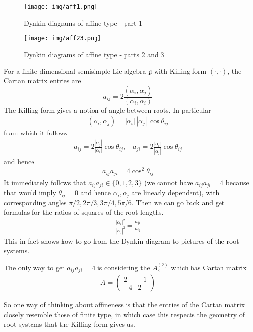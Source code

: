 \documentclass[12pt]{article}
\begin{document}
\begin{figure}[H]
    \centering
    \texttt{[image: img/aff1.png]}
    \caption{Dynkin diagrams of affine type - part 1}
\end{figure}

\begin{figure}[H]
    \centering \texttt{[image: img/aff23.png]}
    \caption{Dynkin diagrams of affine type - parts 2 and 3}
\end{figure}

\begin{remark}
     For a finite-dimensional semisimple Lie algebra $\mathfrak{g}$ with Killing form $(\cdot,\cdot)$, the Cartan matrix entries are 
    \[a_{ij} = 2\frac{(\alpha_i,\alpha_j)}{(\alpha_i,\alpha_i)}\]
    The Killing form gives a notion of angle between roots. In particular \begin{align*}
        (\alpha_i,\alpha_j) = |\alpha_i|\,|\alpha_j|\,\cos\theta_{ij}
    \end{align*} from which it follows \begin{align*}
        a_{ij} = 2 \frac{|\alpha_j|}{|\alpha_i|} \cos\theta_{ij}, \quad
a_{ji} = 2 \frac{|\alpha_i|}{|\alpha_j|} \cos\theta_{ij}
    \end{align*} and hence \begin{align*}
        a_{ij}a_{ji} = 4\cos^2\theta_{ij}
    \end{align*} It immediately follows that $a_{ij}a_{ji} \in \{0,1,2,3\}$ (we cannot have $a_{ij}a_{ji} = 4$ because that would imply $\theta_{ij} = 0$ and hence $\alpha_i, \alpha_j$ are linearly dependent), with corresponding angles $\pi/2, 2\pi/3, 3\pi/4, 5\pi/6$. Then we can go back and get formulas for the ratios of squares of the root lengths. 
    \begin{align*}
        \frac{|\alpha_i|^2}{|\alpha_j|^2} = \frac{a_{ji}}{a_{ij}}
    \end{align*}
    This in fact shows how to go from the Dynkin diagram to pictures of the root systems. 

    The only way to get $a_{ij}a_{ji} = 4$ is considering the $A^{(2)}_2$ which has Cartan matrix \begin{align*}
        A = \begin{pmatrix}
            2  & -1 \\
            -4 & 2
        \end{pmatrix}
    \end{align*} 

    So one way of thinking about affineness is that the entries of the Cartan matrix closely resemble those of finite type, in which case this respects the geometry of root systems that the Killing form gives us.
\end{remark}
\end{document}
